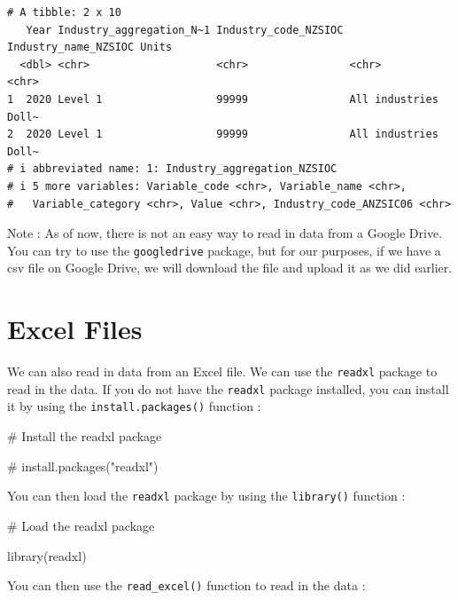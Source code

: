 \documentclass[
  letterpaper,
  DIV=11,
  numbers=noendperiod]{scrreprt}
\newenvironment{Shaded}{\begin{snugshade}}{\end{snugshade}}
\newcommand{\CommentTok}[1]{\textcolor[rgb]{0.37,0.37,0.37}{#1}}
\newcommand{\FunctionTok}[1]{\textcolor[rgb]{0.28,0.35,0.67}{#1}}
\newcommand{\NormalTok}[1]{\textcolor[rgb]{0.00,0.23,0.31}{#1}}
\begin{document}
\begin{verbatim}
# A tibble: 2 x 10
   Year Industry_aggregation_N~1 Industry_code_NZSIOC Industry_name_NZSIOC Units
  <dbl> <chr>                    <chr>                <chr>                <chr>
1  2020 Level 1                  99999                All industries       Doll~
2  2020 Level 1                  99999                All industries       Doll~
# i abbreviated name: 1: Industry_aggregation_NZSIOC
# i 5 more variables: Variable_code <chr>, Variable_name <chr>,
#   Variable_category <chr>, Value <chr>, Industry_code_ANZSIC06 <chr>
\end{verbatim}

Note : As of now, there is not an easy way to read in data from a Google
Drive. You can try to use the \texttt{googledrive} package, but for our
purposes, if we have a csv file on Google Drive, we will download the
file and upload it as we did earlier.

\section*{Excel Files}\label{excel-files}


We can also read in data from an Excel file. We can use the
\texttt{readxl} package to read in the data. If you do not have the
\texttt{readxl} package installed, you can install it by using the
\texttt{install.packages()} function :

\begin{Shaded}
\begin{Highlighting}[]
\CommentTok{\# Install the readxl package}

\CommentTok{\# install.packages("readxl")}
\end{Highlighting}
\end{Shaded}

You can then load the \texttt{readxl} package by using the
\texttt{library()} function :

\begin{Shaded}
\begin{Highlighting}[]
\CommentTok{\# Load the readxl package}

\FunctionTok{library}\NormalTok{(readxl)}
\end{Highlighting}
\end{Shaded}

You can then use the \texttt{read\_excel()} function to read in the data
:
\end{document}

